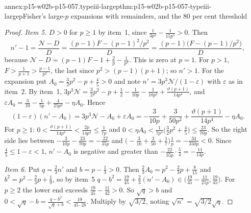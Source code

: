 \begin{annexitem}{annex:p15-w02b-p15-057.typeiii-largep}{thm:p15-w02b-p15-057-typeiii-largep}{Fisher's large-\(p\) expansions with remainders, and the 80 per cent threshold}
\begin{proof}
\emph{Item 5.} \(D>0\) for \(p\geq1\) by item~1, since
\(\frac1{3p^3}-\frac1{15p^5}>0\). Then
\[
 n'-1=\frac{\mathcal N-D}D=\frac{(p-1)F-(p-1)^2/p^2}{D}
 =\frac{(p-1)\bigl(F-(p-1)/p^2\bigr)}{D},
\]
because \(\mathcal N-D=(p-1)F-1+\frac2p-\frac1{p^2}\). This is zero at \(p=1\). For
\(p>1\), \(F>\frac1{p+1}>\frac{p-1}{p^2}\), the last since
\(p^2>(p-1)(p+1)\); so \(n'>1\). For the expansion put
\(A_0=\frac32p^2-p+\frac45>0\) and note \(n'=3p^3\mathcal N/(1-\varepsilon)\) with
\(\varepsilon\) as in item~2. By item~1,
\(3p^3\mathcal N=\frac32p^2-p+\frac12-\frac1{10p}-\frac1{10p^2}
+\frac{\vartheta(p+1)}{14p^4}\), and
\(\varepsilon A_0=\frac3{10}-\frac1{5p}+\frac4{25p^2}-\eta A_0\). Hence
\[
 (1-\varepsilon)(n'-A_0)=3p^3\mathcal N-A_0+\varepsilon A_0
 =-\frac3{10p}+\frac3{50p^2}+\frac{\vartheta(p+1)}{14p^4}-\eta A_0 .
\]
For \(p\geq1\): \(0<\frac{\vartheta(p+1)}{14p^4}<\frac{2p}{14p^4}\leq
\frac1{7p}\) and \(0<\eta A_0<\frac{1}{7p^4}\bigl(\frac32p^2+\frac45\bigr)
\leq\frac{23}{70p}\). So the right side lies between
\(-\frac3{10p}-\frac{23}{70p}=-\frac{22}{35p}\) and
\(\bigl(-\frac3{10}+\frac3{50}+\frac17\bigr)\frac1p=-\frac{34}{350p}<0\).
Since \(\frac45\leq1-\varepsilon<1\), \(n'-A_0\) is negative and greater
than \(-\frac{22}{35p}\cdot\frac54=-\frac{11}{14p}\).

\emph{Item 6.} Put \(q=\frac23n'\) and \(b=p-\frac13>0\). Then
\(\frac23A_0=p^2-\frac23p+\frac8{15}\) and \(b^2=p^2-\frac23p+\frac19\), so
by item~5
\(q-b^2=\frac{19}{45}+\frac23(n'-A_0)\in\bigl(\frac{19}{45}-\frac{11}{21p},
\frac{19}{45}\bigr)\). For \(p\geq2\) the lower end exceeds
\(\frac{19}{45}-\frac{11}{42}>0\). So \(\sqrt q>b\) and
\(0<\sqrt q-b=\frac{q-b^2}{\sqrt q+b}<\frac{19}{45\cdot2b}\). Multiply by
\(\sqrt{3/2}\), noting \(\sqrt{n'}=\sqrt{3/2}\sqrt q\).
\end{proof}
\end{annexitem}

